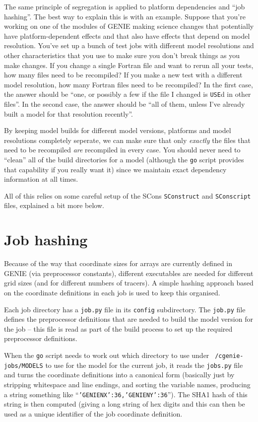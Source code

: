 \documentclass[a4paper,10pt,article]{memoir}
\begin{document}
The same principle of segregation is applied to platform dependencies
and ``job hashing''.  The best way to explain this is with an
example.  Suppose that you're working on one of the modules of GENIE
making science changes that potentially have platform-dependent
effects and that also have effects that depend on model resolution.
You've set up a bunch of test jobs with different model resolutions
and other characteristics that you use to make sure you don't break
things as you make changes.  If you change a single Fortran file and
want to rerun all your tests, how many files need to be recompiled?
If you make a new test with a different model resolution, how many
Fortran files need to be recompiled?  In the first case, the answer
should be ``one, or possibly a few if the file I changed is
\texttt{USE}d in other files''.  In the second case, the answer should
be ``all of them, unless I've already built a model for that
resolution recently''.

By keeping model builds for different model versions, platforms and
model resolutions completely seperate, we can make sure that only
\emph{exactly} the files that need to be recompiled \emph{are}
recompiled in every case.  You should never need to ``clean'' all of
the build directories for a model (although the \texttt{go} script
provides that capability if you really want it) since we maintain
exact dependency information at all times.

All of this relies on some careful setup of the SCons
\texttt{SConstruct} and \texttt{SConscript} files, explained a bit
more below.

\section{Job hashing}

Because of the way that coordinate sizes for arrays are currently
defined in GENIE (via preprocessor constants), different executables
are needed for different grid sizes (and for different numbers of
tracers).  A simple hashing approach based on the coordinate
definitions in each job is used to keep this organised.

Each job directory has a \texttt{job.py} file in its \texttt{config}
subdirectory.  The \texttt{job.py} file defines the preprocessor
definitions that are needed to build the model version for the job --
this file is read as part of the build process to set up the required
preprocessor definitions.

When the \texttt{go} script needs to work out which directory to use
under \texttt{~/cgenie-jobs/MODELS} to use for the model for the
current job, it reads the \texttt{jobs.py} file and turns the
coordinate definitions into a canonical form (basically just by
stripping whitespace and line endings, and sorting the variable names,
producing a string something like
``\texttt{'GENIENX':36,'GENIENY':36}'').  The SHA1 hash of this string
is then computed (giving a long string of hex digits and this can then
be used as a unique identifier of the job coordinate definition.
\end{document}
